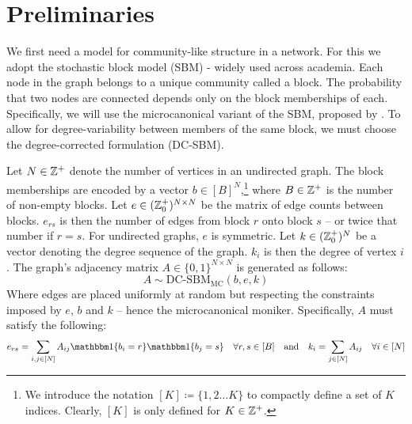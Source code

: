 \section{Preliminaries}

We first need a model for community-like structure in a network. For this we adopt the stochastic block model (SBM) - widely used across academia. Each node in the graph belongs to a unique community called a block. The probability that two nodes are connected depends only on the block memberships of each. Specifically, we will use the microcanonical variant of the SBM, proposed by \citet{Peixoto-Bayesian-Microcanonical}. To allow for degree-variability between members of the same block, we must choose the degree-corrected formulation (DC-SBM).

\begin{definition}
	\label{defn:microcan-dc-sbm}
	Let $N \in \mathbb{Z}^{+}$ denote the number of vertices in an undirected graph. The block memberships are encoded by a vector $b \in [B]^N$,\footnote{We introduce the notation $[K] \coloneqq \{1, 2 \dots K\}$ to compactly define a set of $K$ indices. Clearly, $[K]$ is only defined for $K \in \mathbb{Z}^+$.}
	where $B \in \mathbb{Z}^{+}$ is the number of non-empty blocks.
	Let $e \in (\mathbb{Z}_0^+)^{N \times N}$ be the matrix of edge counts between blocks. $e_{rs}$ is then the number of edges from block $r$ onto block $s$ -- or twice that number if $r=s$. For undirected graphs, $e$ is symmetric.
	Let $k \in (\mathbb{Z}^+_0)^N$ be a vector denoting the degree sequence of the graph. $k_i$ is then the degree of vertex $i$. The graph's adjacency matrix $A \in \{0,1\}^{N \times N}$ is generated as follows:
	\begin{equation}
		A \sim \textrm{DC-SBM}_{\textrm{MC}} (b, e, k)
	\end{equation}
	Where edges are placed uniformly at random but respecting the constraints imposed by $e$, $b$ and $k$ -- hence the microcanonical moniker. Specifically, $A$ must satisfy the following:
	\begin{equation}
		e_{rs} = \sum_{i, j \in [N]} A_{ij} \one \{b_i = r\} \one \{b_j = s\} \quad \forall r,s \in [B]
		\quad \textrm{and} \quad
		k_i = \sum_{j \in [N]} A_{ij} \quad \forall i \in [N]
		\label{eqn:sbm-constraints}
	\end{equation}
\end{definition}